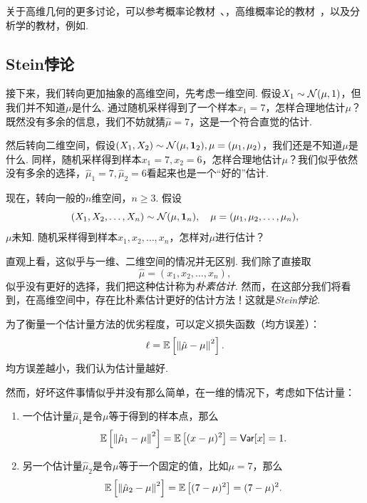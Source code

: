 \begin{remark}
    关于高维几何的更多讨论，可以参考概率论教材~\cite{durrettProbabilityTheoryExamples2019}、\cite{shiryaevProbability1996}，高维概率论的教材~\cite{vershyninHighDimensionalProbabilityIntroduction2018}，以及分析学的教材，例如\cite{zorichMathematicalAnalysisII2016}.
\end{remark}

\subsection{Stein悖论}
接下来，我们转向更加抽象的高维空间，先考虑一维空间. 假设$X_1 \sim \mathcal{N}(\mu,1)$，但我们并不知道$\mu$是什么. 通过随机采样得到了一个样本$x_1 = 7$，怎样合理地估计$\mu$？既然没有多余的信息，我们不妨就猜$\hat{\mu} = 7$，这是一个符合直觉的估计. 

然后转向二维空间，假设$(X_1, X_2) \sim \mathcal{N}(\mu,\mathbf{1}_2), \mu=(\mu_1,\mu_2)$，我们还是不知道$\mu$是什么. 同样，随机采样得到样本$x_1 = 7, x_2=6$，怎样合理地估计$\mu$？我们似乎依然没有多余的选择，$\hat{\mu}_1 = 7, \hat{\mu}_2=6$看起来也是一个“好的”估计. 

现在，转向一般的$n$维空间，$n\geq 3$. 假设
\[(X_1,X_2,\dots, X_n) \sim \mathcal{N}(\mu, \mathbf{1}_n),\quad \mu=(\mu_1,\mu_2,\dots,\mu_n),\]
$\mu$未知. 随机采样得到样本$x_1,x_2,\dots,x_n$，怎样对$\mu$进行估计？

直观上看，这似乎与一维、二维空间的情况并无区别. 我们除了直接取
\begin{equation}
    \hat{\mu}=(x_1,x_2,\dots,x_n), \label{eq:naive-estimation}
\end{equation}
似乎没有更好的选择，我们把这种估计称为\textit{朴素估计}. 然而，在这部分我们将看到，在高维空间中，存在比朴素估计更好的估计方法！这就是\textit{Stein悖论}. 

为了衡量一个估计量方法的优劣程度，可以定义损失函数（均方误差）：
\[\ell = \mathbb{E}\left[\left\|\hat{\mu}-\mu\right\|^2\right].\]
均方误差越小，我们认为估计量越好. 

然而，好坏这件事情似乎并没有那么简单，在一维的情况下，考虑如下估计量：
\begin{enumerate}
    \item 一个估计量$\hat\mu_1$是令$\mu$等于得到的样本点，那么
    \[\mathbb{E}\left[\left\|\hat{\mu}_1-\mu\right\|^2\right] = \mathbb{E}\left[(x-\mu)^2\right]=\mathsf{Var}[x]=1.\]
    \item 另一个估计量$\hat\mu_2$是令$\mu$等于一个固定的值，比如$\mu=7$，那么
    \[\mathbb{E}\left[\left\|\hat{\mu}_2-\mu\right\|^2\right] = \mathbb{E}\left[(7-\mu)^2\right]=(7-\mu)^2.\]
\end{enumerate}

